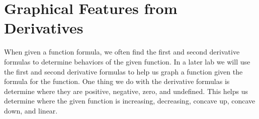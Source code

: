 \documentclass[10pt,oneside,]{book}
\theoremstyle{plain}
\theoremstyle{definition}
\numberwithin{equation}{section}
\begin{document}
\section[Graph Features from Derivatives]{Graphical Features from Derivatives}\label{section-graphical-features-from-derivatives}
When given a function formula, we  often find the first and second derivative formulas to determine behaviors of the given function.  In a later lab we will use the first and second derivative formulas to help us graph a function given the formula for the function.  One thing we do with the derivative formulas is determine where they are positive, negative, zero, and undefined. This helps us determine where the given function is increasing, decreasing, concave up, concave down, and linear.%
\typeout{************************************************}
\typeout{************************************************}
\end{document}
